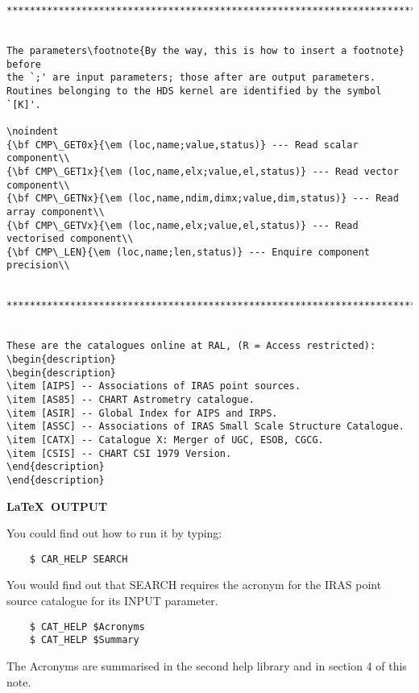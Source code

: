 \begin{verbatim}
********************************************************************************


The parameters\footnote{By the way, this is how to insert a footnote} before
the `;' are input parameters; those after are output parameters.
Routines belonging to the HDS kernel are identified by the symbol `[K]'.

\noindent
{\bf CMP\_GET0x}{\em (loc,name;value,status)} --- Read scalar component\\
{\bf CMP\_GET1x}{\em (loc,name,elx;value,el,status)} --- Read vector component\\
{\bf CMP\_GETNx}{\em (loc,name,ndim,dimx;value,dim,status)} --- Read array component\\
{\bf CMP\_GETVx}{\em (loc,name,elx;value,el,status)} --- Read vectorised component\\
{\bf CMP\_LEN}{\em (loc,name;len,status)} --- Enquire component precision\\


********************************************************************************


These are the catalogues online at RAL, (R = Access restricted):
\begin{description}
\begin{description}
\item [AIPS] -- Associations of IRAS point sources.
\item [AS85] -- CHART Astrometry catalogue.
\item [ASIR] -- Global Index for AIPS and IRPS.
\item [ASSC] -- Associations of IRAS Small Scale Structure Catalogue.
\item [CATX] -- Catalogue X: Merger of UGC, ESOB, CGCG.
\item [CSIS] -- CHART CSI 1979 Version.
\end{description}
\end{description}
\end{verbatim}

\newpage

\begin{center}
{\bf \LaTeX\ OUTPUT}
\end{center}

You could find out how to run it by typing:
\begin{verbatim}
    $ CAR_HELP SEARCH
\end{verbatim}
You would find out that SEARCH requires the acronym for the IRAS point source
catalogue for its INPUT parameter.
\begin{verbatim}
    $ CAT_HELP $Acronyms
    $ CAT_HELP $Summary
\end{verbatim}
The Acronyms are summarised in the second help library and in section 4 of this
note.


